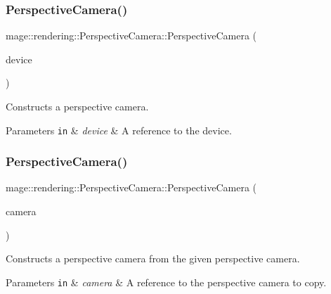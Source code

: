 \subsubsection{\texorpdfstring{Perspective\+Camera()}{PerspectiveCamera()}\hspace{0.1cm}{\footnotesize\ttfamily [1/3]}}
{\footnotesize\ttfamily mage\+::rendering\+::\+Perspective\+Camera\+::\+Perspective\+Camera (\begin{DoxyParamCaption}\item[{I\+D3\+D11\+Device \&}]{device }\end{DoxyParamCaption})}

Constructs a perspective camera.


\begin{DoxyParams}[1]{Parameters}
\mbox{\tt in}  & {\em device} & A reference to the device. \\
\hline
\end{DoxyParams}
\hypertarget{classmage_1_1rendering_1_1_perspective_camera_ad4b54caa651462e68089436a8a1f8dc0}{}\label{classmage_1_1rendering_1_1_perspective_camera_ad4b54caa651462e68089436a8a1f8dc0} 
\subsubsection{\texorpdfstring{Perspective\+Camera()}{PerspectiveCamera()}\hspace{0.1cm}{\footnotesize\ttfamily [2/3]}}
{\footnotesize\ttfamily mage\+::rendering\+::\+Perspective\+Camera\+::\+Perspective\+Camera (\begin{DoxyParamCaption}\item[{const \hyperlink{classmage_1_1rendering_1_1_perspective_camera}{Perspective\+Camera} \&}]{camera }\end{DoxyParamCaption})\hspace{0.3cm}{\ttfamily [delete]}}

Constructs a perspective camera from the given perspective camera.


\begin{DoxyParams}[1]{Parameters}
\mbox{\tt in}  & {\em camera} & A reference to the perspective camera to copy. \\
\hline
\end{DoxyParams}
\hypertarget{classmage_1_1rendering_1_1_perspective_camera_a3d342252cefbffe69537e1ccc95a379a}{}\label{classmage_1_1rendering_1_1_perspective_camera_a3d342252cefbffe69537e1ccc95a379a} 
